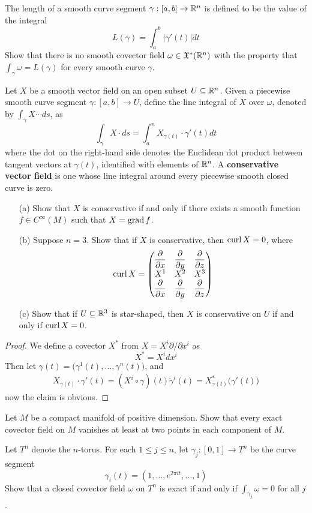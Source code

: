 \begin{exercise}
The length of a smooth curve segment $\gamma:[a,b]\to\mathbb{R}^n$ is defined to be the
value of the integral
\[L(\gamma)=\int_{a}^{b}|\gamma'(t)|dt\]
Show that there is no smooth covector field $\omega\in\mathfrak{X}^*(\mathbb{R}^n)$ with the property that $\int_\gamma\omega=L(\gamma)$ for every smooth curve $\gamma$.
\end{exercise}
\begin{exercise}
Let $X$ be a smooth vector field on an open subset $U\subseteq\mathbb{R}^n$. Given a piecewise smooth curve segment $\gamma:[a,b]\to U$, define the line integral of $X$ over $\omega$, denoted by $\int_\gamma X\cdots ds$, as
\[\int_\gamma X\cdot ds=\int_{a}^{n}X_{\gamma(t)}\cdot\gamma'(t)dt\]
where the dot on the right-hand side denotes the Euclidean dot product between
tangent vectors at $\gamma(t)$, identified with elements of $\mathbb{R}^n$. A \textbf{conservative vector field} is one whose line integral around every piecewise smooth closed curve is zero.
\begin{itemize}
\item[(a)]Show that $X$ is conservative if and only if there exists a smooth function $f\in C^\infty(M)$ such that $X=\mathrm{grad}\, f$.
\item[(b)]Suppose $n=3$. Show that if $X$ is conservative, then $\mathrm{curl}\, X=0$, where
\[\mathrm{curl}\, X=\begin{pmatrix}
\dfrac{\partial}{\partial x}&\dfrac{\partial}{\partial y}&\dfrac{\partial}{\partial z}\\
X^1&X^2&X^3\\
\dfrac{\partial}{\partial x}&\dfrac{\partial}{\partial y}&\dfrac{\partial}{\partial z}
\end{pmatrix}\]
\item[(c)]Show that if $U\subseteq\mathbb{R}^3$ is star-shaped, then $X$ is conservative on $U$ if and only if $\mathrm{curl}\, X=0$.
\end{itemize}
\end{exercise}
\begin{proof}
We define a covector $X^*$ from $X=X^i\partial/\partial x^i$ as
\[X^*=X^idx^i\]
Then let $\gamma(t)=\big(\gamma^1(t),\dots,\gamma^n(t)\big)$, and
\begin{align*}
X_{\gamma(t)}\cdot\gamma'(t)=(X^i\circ\gamma)(t)\dot{\gamma}^i(t)=X^*_{\gamma(t)}\big(\gamma'(t)\big)
\end{align*}
now the claim is obvious.
\end{proof}
\begin{exercise}
Let $M$ be a compact manifold of positive dimension. Show that every exact covector field on $M$ vanishes at least at two points in each component
of $M$.
\end{exercise}
\begin{exercise}
Let $T^n$ denote the $n$-torus. For each $1\leq j\leq n$, let $\gamma_j:[0,1]\to T^n$ be the curve segment
\[\gamma_i(t)=(1,\dots,e^{2\pi it},\dots,1)\]
Show that a closed covector field $\omega$ on $T^n$ is exact if and only if $\int_{\gamma_j}\omega=0$ for all $j$.
\end{exercise}
